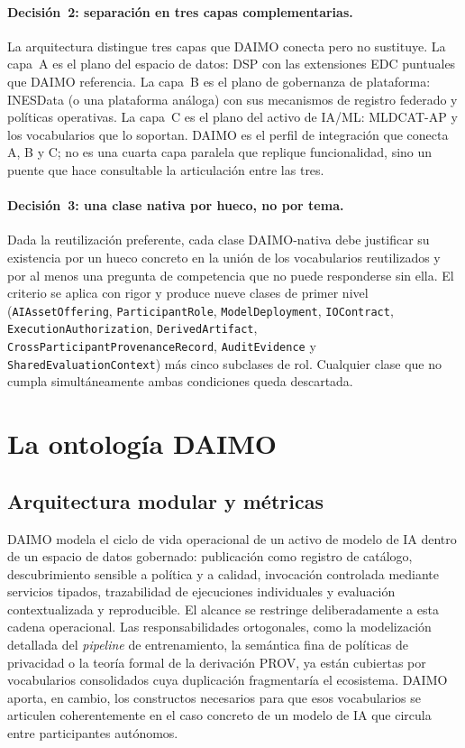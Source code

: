 \documentclass[11pt,a4paper]{article}
\newcommand{\code}[1]{\texttt{#1}}
\begin{document}
\paragraph{Decisión~2: separación en tres capas complementarias.} La arquitectura distingue tres capas que DAIMO conecta pero no sustituye. La capa~A es el plano del espacio de datos: DSP con las extensiones EDC puntuales que DAIMO referencia. La capa~B es el plano de gobernanza de plataforma: INESData (o una plataforma análoga) con sus mecanismos de registro federado y políticas operativas. La capa~C es el plano del activo de IA/ML: MLDCAT-AP y los vocabularios que lo soportan. DAIMO es el perfil de integración que conecta A, B y C; no es una cuarta capa paralela que replique funcionalidad, sino un puente que hace consultable la articulación entre las tres.

\paragraph{Decisión~3: una clase nativa por hueco, no por tema.} Dada la reutilización preferente, cada clase DAIMO-nativa debe justificar su existencia por un hueco concreto en la unión de los vocabularios reutilizados y por al menos una pregunta de competencia que no puede responderse sin ella. El criterio se aplica con rigor y produce nueve clases de primer nivel (\code{AIAssetOffering}, \code{ParticipantRole}, \code{ModelDeployment}, \code{IOContract}, \code{ExecutionAuthorization}, \code{DerivedArtifact}, \code{CrossParticipantProvenanceRecord}, \code{AuditEvidence} y \code{SharedEvaluationContext}) más cinco subclases de rol. Cualquier clase que no cumpla simultáneamente ambas condiciones queda descartada.

\section{La ontología DAIMO}\label{sec:ontology}

\subsection{Arquitectura modular y métricas}\label{sec:scope}

DAIMO modela el ciclo de vida operacional de un activo de modelo de IA dentro de un espacio de datos gobernado: publicación como registro de catálogo, descubrimiento sensible a política y a calidad, invocación controlada mediante servicios tipados, trazabilidad de ejecuciones individuales y evaluación contextualizada y reproducible. El alcance se restringe deliberadamente a esta cadena operacional. Las responsabilidades ortogonales, como la modelización detallada del \emph{pipeline} de entrenamiento, la semántica fina de políticas de privacidad o la teoría formal de la derivación PROV, ya están cubiertas por vocabularios consolidados cuya duplicación fragmentaría el ecosistema. DAIMO aporta, en cambio, los constructos necesarios para que esos vocabularios se articulen coherentemente en el caso concreto de un modelo de IA que circula entre participantes autónomos.
\end{document}
